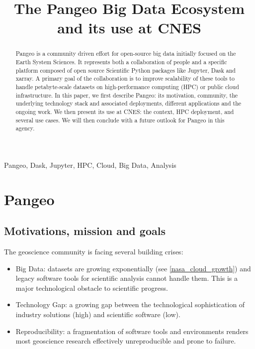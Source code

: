 \documentclass{article}
\title{The Pangeo Big Data Ecosystem and its use at CNES}
\begin{document}
%
\maketitle
%
\begin{abstract}
Pangeo\cite{b1} is a community driven effort for open-source big data initially focused on the Earth System Sciences. It represents both a collaboration of people and a specific platform composed of open source Scientific Python packages like Jupyter, Dask and xarray. A primary goal of the collaboration is to improve scalability of these tools to handle petabyte-scale datasets on high-performance computing (HPC) or public cloud infrastructure.
In this paper, we first describe Pangeo: its motivation, community, the underlying technology stack and associated deployments, different applications and the ongoing work. We then present its use at CNES: the context, HPC deployment, and several use cases. We will then conclude with a future outlook for Pangeo in this agency.
\end{abstract}
%
\begin{keywords}
Pangeo, Dask, Jupyter, HPC, Cloud, Big Data, Analysis
\end{keywords}
%
\section{Pangeo}
\label{sec:pangeo}

\subsection{Motivations, mission and goals}
\label{ssec:motivations}

The geoscience community is facing several building crises:

\begin{itemize}
\item Big Data: datasets are growing exponentially (see \ref{nasa_cloud_growth}) and legacy software tools for scientific analysis cannot handle them. This is a major technological obstacle to scientific progress.
\item Technology Gap: a growing gap between the technological sophistication of industry solutions (high) and scientific software (low).
\item Reproducibility: a fragmentation of software tools and environments renders most geoscience research effectively unreproducible and prone to failure.
\end{itemize}
\end{document}
